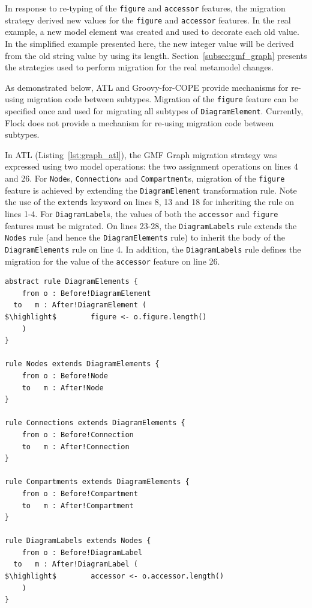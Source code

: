 In response to re-typing of the \texttt{figure} and \texttt{accessor} features, the
migration strategy derived new values for the \texttt{figure} and \texttt{accessor} features. In the real example, a new model element was created and used to decorate \cite{gamma95patterns} each old value. In the simplified example presented here, the new integer value will be derived from the old string value by using its length. Section~\ref{subsec:gmf_graph} presents the strategies used to perform migration for the real metamodel changes.

As demonstrated below, ATL and Groovy-for-COPE provide mechanisms for re-using migration code between subtypes. Migration of the \texttt{figure} feature can be specified once and used for migrating all subtypes of \texttt{Di\-ag\-ramEl\-em\-e\-nt}. Currently, Flock does not provide a mechanism for re-using migration code between subtypes.

In ATL (Listing~\ref{lst:graph_atl}), the GMF Graph migration strategy was expressed using two model operations: the two assignment operations on lines 4 and 26. For \texttt{Node}s, \texttt{Connection}s and \texttt{Compartment}s, migration of the \texttt{figure} feature is achieved by extending the \texttt{DiagramElement} transformation rule. Note the use of the \texttt{extends} keyword on lines 8, 13 and 18 for inheriting the rule on lines 1-4. For \texttt{DiagramLabel}s, the values of both the \texttt{accessor} and \texttt{figure} features must be migrated. On lines 23-28, the \texttt{DiagramLabels} rule extends the \texttt{Nodes} rule (and hence the \texttt{DiagramElements} rule) to inherit the body of the \texttt{DiagramElements} rule on line 4. In addition, the \texttt{DiagramLabels} rule defines the migration for the value of the \texttt{accessor} feature on line 26.

\begin{lstlisting}[float=tbp, caption=Simplified GMF Graph model migration in ATL, label=lst:graph_atl, language=ATL, tabsize=2]
abstract rule DiagramElements {
	from o : Before!DiagramElement
  to   m : After!DiagramElement (
$\highlight$ 		figure <- o.figure.length()
	)
}

rule Nodes extends DiagramElements {
	from o : Before!Node
	to   m : After!Node
}

rule Connections extends DiagramElements {
	from o : Before!Connection
	to   m : After!Connection
}

rule Compartments extends DiagramElements {
	from o : Before!Compartment
	to   m : After!Compartment
}

rule DiagramLabels extends Nodes {
	from o : Before!DiagramLabel
  to   m : After!DiagramLabel (
$\highlight$		accessor <- o.accessor.length()
	)
}
\end{lstlisting}

